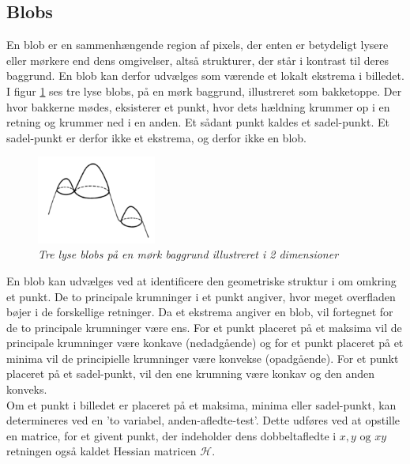 \subsection*{Blobs}\label{sec:blobs}
En blob er en sammenhængende region af pixels, der enten er betydeligt lysere eller mørkere end dens omgivelser, altså strukturer, der står i kontrast til deres baggrund. En blob kan derfor udvælges som værende et lokalt ekstrema i billedet.
I figur \ref{fig:lindblob} ses tre lyse blobs, på en mørk baggrund, illustreret som bakketoppe. Der hvor bakkerne mødes, eksisterer et punkt, hvor dets hældning krummer op i en retning og krummer ned i en anden. Et sådant punkt kaldes et sadel-punkt. Et sadel-punkt er derfor ikke et ekstrema, og derfor ikke en blob.
\begin{figure}[H]
    \centering
    \includegraphics[width=0.35\textwidth]{fig/44.png}
    \vspace{-0.5em}   
    \begin{center}
    \caption{{\footnotesize \textit{
    Tre lyse blobs på en mørk baggrund illustreret i 2 dimensioner \cite{blob}}}}
    \label{fig:lindblob}
     \end{center}
  \end{figure}
       \vspace{-2.7em}
\noindent
En blob kan udvælges ved at identificere den geometriske struktur i om omkring et punkt. De to principale krumninger i et punkt angiver, hvor meget overfladen bøjer i de forskellige retninger. Da et ekstrema angiver en blob, vil fortegnet for de to principale krumninger være ens. For et punkt placeret på et maksima vil de principale krumninger være konkave (nedadgående) og for et punkt placeret på et minima vil de principielle krumninger være konvekse (opadgående). For et punkt placeret på et sadel-punkt, vil den ene krumning være konkav og den anden konveks. \\ 
Om et punkt i billedet er placeret på et maksima, minima eller sadel-punkt, kan determineres ved en 'to variabel, anden-afledte-test'. Dette udføres ved at opstille en matrice, for et givent punkt, der indeholder dens dobbeltafledte i $x, y \text{ og } xy$ retningen også kaldet Hessian matricen $\mathcal{H}$.
